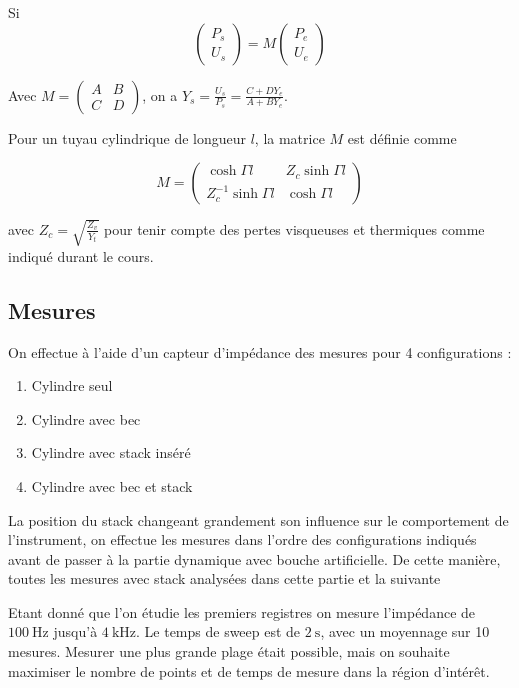 \documentclass[atiam, article]{rapport} %
\begin{document}
Si $$\begin{pmatrix}
    P_s\\U_s
\end{pmatrix} =
M
\begin{pmatrix}
    P_e\\U_e
\end{pmatrix}$$

Avec $M = \begin{pmatrix}A & B\\C&D\end{pmatrix}$, on a $Y_s = \frac{U_s}{P_s} = \frac{C + D Y_e}{A + B Y_e}$. 

Pour un tuyau cylindrique de longueur $l$, la matrice $M$ est définie comme

\begin{equation}
    M = \begin{pmatrix}
        \cosh \Gamma l & Z_c \sinh \Gamma l \\
        Z_c^{-1} \sinh \Gamma l & \cosh \Gamma l
    \end{pmatrix}
    \label{eq:mat_trans_cylindre}
\end{equation}

avec $Z_c = \sqrt{\frac{Z_v}{Y_t}}$ pour tenir compte des pertes visqueuses et thermiques comme indiqué durant le cours\cite{Vergez4}.

\subsection{Mesures}

On effectue à l'aide d'un capteur d'impédance des mesures pour 4 configurations :
\begin{enumerate}
    \item Cylindre seul
    \item Cylindre avec bec
    \item Cylindre avec stack inséré
    \item Cylindre avec bec et stack
\end{enumerate}

La position du stack changeant grandement son influence sur le comportement de l'instrument, on effectue les mesures dans l'ordre des configurations indiqués avant de passer à la partie dynamique avec bouche artificielle. De cette manière, toutes les mesures avec stack analysées dans cette partie et la suivante 

Etant donné que l'on étudie les premiers registres on  mesure l'impédance de $\SI{100}{\Hz}$ jusqu'à $\SI{4}{\kHz}$. 
Le temps de sweep est de $\SI{2}{\s}$, avec un moyennage sur 10 mesures.
Mesurer une plus grande plage était possible, mais on souhaite maximiser le nombre de points et de temps de mesure dans la région d'intérêt.
\end{document}
